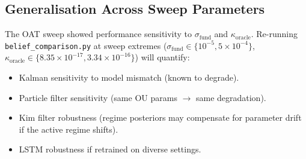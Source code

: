 \documentclass[11pt]{article}
\begin{document}
\subsection{Generalisation Across Sweep Parameters}

The OAT sweep showed performance sensitivity to $\sigma_{\text{fund}}$ and
$\kappa_{\text{oracle}}$.
Re-running \texttt{belief\_comparison.py} at sweep extremes
($\sigma_{\text{fund}} \in \{10^{-5}, 5 \times 10^{-4}\}$,
$\kappa_{\text{oracle}} \in \{8.35 \times 10^{-17}, 3.34 \times 10^{-16}\}$)
will quantify:
\begin{itemize}[leftmargin=1.5em]
  \item Kalman sensitivity to model mismatch (known to degrade).
  \item Particle filter sensitivity (same OU params $\to$ same degradation).
  \item Kim filter robustness (regime posteriors may compensate for
    parameter drift if the active regime shifts).
  \item LSTM robustness if retrained on diverse settings.
\end{itemize}
\end{document}
